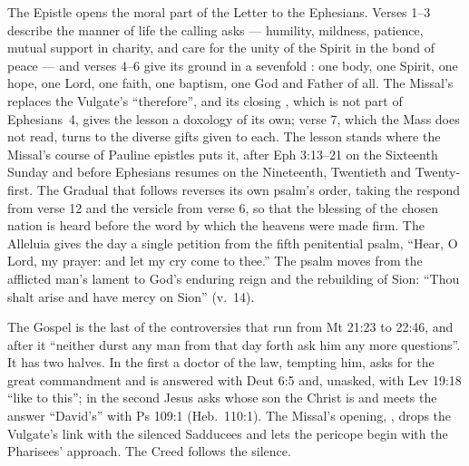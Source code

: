 The Epistle opens the moral part of the Letter to the Ephesians. Verses 1--3
describe the manner of life the calling asks --- humility, mildness, patience,
mutual support in charity, and care for the unity of the Spirit in the bond of
peace --- and verses 4--6 give its ground in a sevenfold : one
body, one Spirit, one hope, one Lord, one faith, one baptism, one God and
Father of all. The Missal's  replaces the Vulgate's ``therefore'',
and its closing , which
is not part of Ephesians~4, gives the lesson a doxology of its own; verse 7,
which the Mass does not read, turns to the diverse gifts given to each. The
lesson stands where the Missal's course of Pauline epistles
puts it, after Eph 3:13--21 on the Sixteenth Sunday and before Ephesians
resumes on the Nineteenth, Twentieth and Twenty-first. The Gradual that follows
reverses its own psalm's order, taking the respond from verse 12 and the
versicle from verse 6, so that the blessing of the chosen nation is heard
before the word by which the heavens were made firm. The Alleluia gives the
day a single petition from the fifth penitential psalm, ``Hear, O Lord, my
prayer: and let my cry come to thee.'' The psalm moves from the afflicted
man's lament to God's enduring reign and the rebuilding of Sion: ``Thou shalt
arise and have mercy on Sion'' (v.~14).

The Gospel is the last of the controversies that run from Mt 21:23 to 22:46,
and after it ``neither durst any man from that day forth ask him any more
questions''. It has two halves. In the first a doctor of the law, tempting
him, asks for the great commandment and is answered with Deut 6:5 and, unasked,
with Lev 19:18 ``like to this''; in the second Jesus asks whose son the Christ
is and meets the answer ``David's'' with Ps 109:1 (Heb.\ 110:1). The Missal's
opening,
, drops the Vulgate's link with the
silenced Sadducees and lets the pericope begin with the Pharisees' approach.
The Creed follows the silence.

